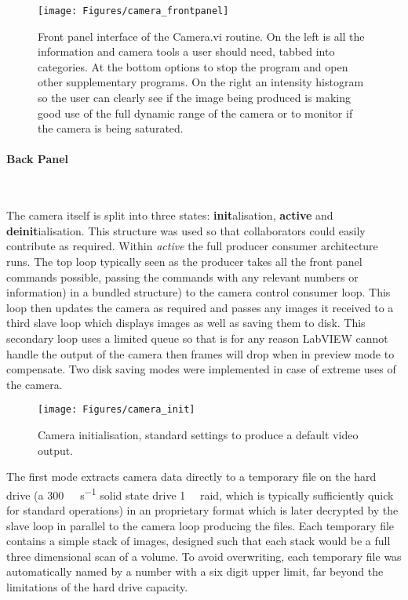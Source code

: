 \documentclass[10pt,a4paper]{report}
\begin{document}
\begin{spacing}{1.5}
\begin{figure}
\centering
\texttt{[image: Figures/camera\_frontpanel]}
\caption[Front Panel of Camera.vi]{Front panel interface of the Camera.vi routine. On the left is all the information and camera tools a user should need, tabbed into categories. At the bottom options to stop the program and open other supplementary programs. On the right an intensity histogram so the user can clearly see if the image being produced is making good use of the full dynamic range of the camera or to monitor if the camera is being saturated.}
\label{fig:camera_frontpanel}
\end{figure}

\paragraph{Back Panel}~

The camera itself is split into three states: \textbf{init}alisation, \textbf{active} and \textbf{deinit}ialisation. This structure was used so that collaborators could easily contribute as required. Within \textit{active} the full producer consumer architecture runs. The top loop typically seen as the producer takes all the front panel commands possible, passing the commands with any relevant numbers or information) in a bundled structure) to the camera control consumer loop. This loop then updates the camera as required and passes any images it received to a third slave loop which displays images as well as saving them to disk. This secondary loop uses a limited queue so that is for any reason LabVIEW cannot handle the output of the camera then frames will drop when in preview mode to compensate. Two disk saving modes were implemented in case of extreme uses of the camera.

\begin{figure}
	\centering
	\texttt{[image: Figures/camera\_init]}
	\caption[Camera initialisation state]{Camera initialisation, standard settings to produce a default video output.}
	\label{fig:camera_init}
\end{figure}

The first mode extracts camera data directly to a temporary file on the hard drive (a \SI{300}{\mega\byte\per\second} solid state drive \SI{1}{\tera\byte} raid, which is typically sufficiently quick for standard operations) in an proprietary format which is later decrypted by the slave loop in parallel to the camera loop producing the files. Each temporary file contains a simple stack of images, designed such that each stack would be a full three dimensional scan of a volume. To avoid overwriting, each temporary file was automatically named by a number with a six digit upper limit, far beyond the limitations of the hard drive capacity.


\end{spacing}
\end{document}

